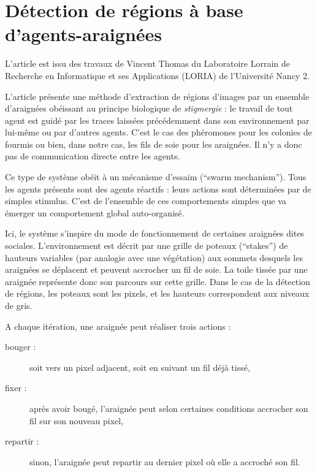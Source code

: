 \section{Détection de régions à base d'agents-araignées}

L'article \cite{spiders} est issu des travaux de Vincent Thomas du Laboratoire Lorrain de Recherche en Informatique et ses Applications (LORIA) de l'Université Nancy 2.

L'article présente une méthode d'extraction de régions d'images par un ensemble d'araignées obéissant au principe biologique de \emph{stigmergie} : le travail de tout agent est guidé par les traces laissées précédemment dans son environnement par lui-même ou par d'autres agents. C'est le cas des phéromones pour les colonies de fourmis ou bien, dans notre cas, les fils de soie pour les araignées. Il n'y a donc pas de communication directe entre les agents.

Ce type de système obéit à un \og{}mécanisme d'essaim \fg{} (``swarm mechanism''). Tous les agents présents sont des agents réactifs : leurs actions sont déterminées par de simples stimulus. C'est de l'ensemble de ces comportements simples que va émerger un comportement global auto-organisé.
 
Ici, le système s'inspire du mode de fonctionnement de certaines araignées dites sociales. L'environnement est décrit par une grille de poteaux (``stakes'') de hauteurs variables (par analogie avec une végétation) aux sommets desquels les araignées se déplacent et peuvent accrocher un fil de soie. La toile tissée par une araignée représente donc son parcours sur cette grille.
Dans le cas de la détection de régions, les poteaux sont les pixels, et les hauteurs correspondent aux niveaux de gris.

A chaque itération, une araignée peut réaliser trois actions :
\begin{description}
  \item[bouger :] soit vers un pixel adjacent, soit en suivant un fil déjà tissé,
  \item[fixer :] après avoir bougé, l'araignée peut selon certaines conditions accrocher son fil sur son nouveau pixel,
  \item[repartir :] sinon, l'araignée peut repartir au dernier pixel où elle a accroché son fil.
\end{description}

